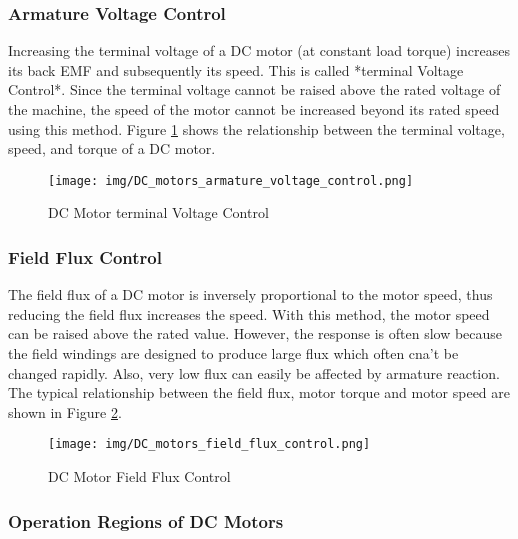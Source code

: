 \documentclass[a4paper]{article}
\begin{document}
\subsubsection{Armature Voltage Control}
Increasing the terminal voltage of a DC motor (at constant load torque) increases its back EMF and subsequently its speed. 
This is called *terminal Voltage Control*. Since the terminal voltage cannot be raised above the rated voltage of the machine, 
the speed of the motor cannot be increased beyond its rated speed using this method. 
Figure \ref{fig:DC_motor_vol} shows the relationship between the terminal voltage, speed, and torque of a DC motor.
\\
\begin{figure}
        \centering
        \texttt{[image: img/DC\_motors\_armature\_voltage\_control.png]}
        \caption{DC Motor terminal Voltage Control \cite{kim17}}
        \label{fig:DC_motor_vol}
\end{figure}

\subsubsection{Field Flux Control}
The field flux of a DC motor is inversely proportional to the motor speed, thus reducing the field flux increases the speed. 
With this method, the motor speed can be raised above the rated value. 
However, the response is often slow because the field windings are designed to produce large flux which often cna't be changed 
rapidly. Also, very low flux can easily be affected by armature reaction.
The typical relationship between the field flux, motor torque and motor speed are shown in Figure \ref{fig:DC_motor_flux}.
\\
\begin{figure}
        \centering
        \texttt{[image: img/DC\_motors\_field\_flux\_control.png]}
        \caption{DC Motor Field Flux Control \cite{kim17}}
        \label{fig:DC_motor_flux}
\end{figure}

\subsubsection{Operation Regions of DC Motors}
\end{document}
